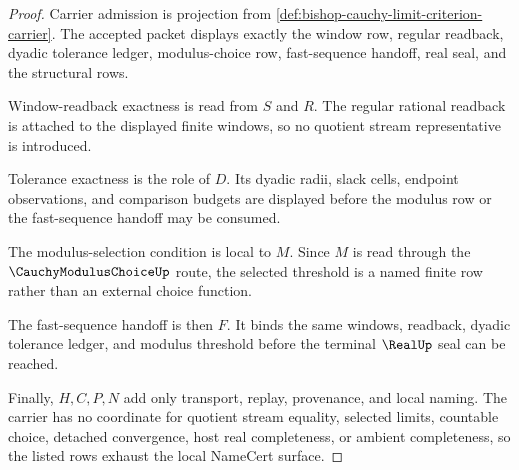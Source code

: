 \begin{proof}
Carrier admission is projection from \autoref{def:bishop-cauchy-limit-criterion-carrier}. The accepted packet displays exactly the window row, regular readback, dyadic tolerance ledger, modulus-choice row, fast-sequence handoff, real seal, and the structural rows.

Window-readback exactness is read from $S$ and $R$. The regular rational readback is attached to the displayed finite windows, so no quotient stream representative is introduced.

Tolerance exactness is the role of $D$. Its dyadic radii, slack cells, endpoint observations, and comparison budgets are displayed before the modulus row or the fast-sequence handoff may be consumed.

The modulus-selection condition is local to $M$. Since $M$ is read through the $\CauchyModulusChoiceUp$ route, the selected threshold is a named finite row rather than an external choice function.

The fast-sequence handoff is then $F$. It binds the same windows, readback, dyadic tolerance ledger, and modulus threshold before the terminal $\RealUp$ seal can be reached.

Finally, $H,C,P,N$ add only transport, replay, provenance, and local naming. The carrier has no coordinate for quotient stream equality, selected limits, countable choice, detached convergence, host real completeness, or ambient completeness, so the listed rows exhaust the local NameCert surface.
\end{proof}

